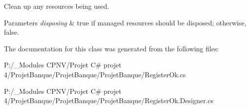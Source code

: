 Clean up any resources being used. 


\begin{DoxyParams}{Parameters}
{\em disposing} & true if managed resources should be disposed; otherwise, false.\\
\hline
\end{DoxyParams}


The documentation for this class was generated from the following files\+:\begin{DoxyCompactItemize}
\item 
P\+:/\+\_\+\+Modules C\+P\+N\+V/\+Projet C\# projet 4/\+Projet\+Banque/\+Projet\+Banque/\+Projet\+Banque/Register\+Ok.\+cs\item 
P\+:/\+\_\+\+Modules C\+P\+N\+V/\+Projet C\# projet 4/\+Projet\+Banque/\+Projet\+Banque/\+Projet\+Banque/Register\+Ok.\+Designer.\+cs\end{DoxyCompactItemize}
